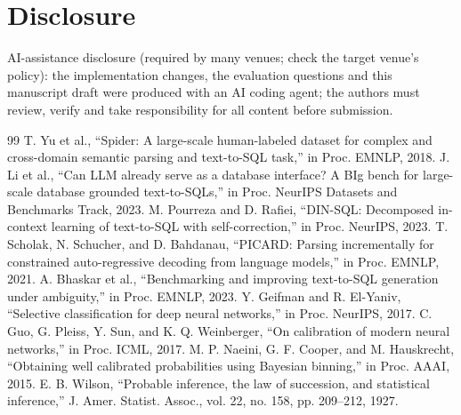 \documentclass[conference]{IEEEtran}
\begin{document}
\section*{Disclosure}AI-assistance disclosure (required by many venues; check the target venue's policy): the implementation changes, the evaluation questions and this manuscript draft were produced with an AI coding agent; the authors must review, verify and take responsibility for all content before submission.
\begin{thebibliography}{99} T. Yu et al., ``Spider: A large-scale human-labeled dataset for complex and cross-domain semantic parsing and text-to-SQL task,'' in Proc. EMNLP, 2018.
 J. Li et al., ``Can LLM already serve as a database interface? A BIg bench for large-scale database grounded text-to-SQLs,'' in Proc. NeurIPS Datasets and Benchmarks Track, 2023.
 M. Pourreza and D. Rafiei, ``DIN-SQL: Decomposed in-context learning of text-to-SQL with self-correction,'' in Proc. NeurIPS, 2023.
 T. Scholak, N. Schucher, and D. Bahdanau, ``PICARD: Parsing incrementally for constrained auto-regressive decoding from language models,'' in Proc. EMNLP, 2021.
 A. Bhaskar et al., ``Benchmarking and improving text-to-SQL generation under ambiguity,'' in Proc. EMNLP, 2023.
 Y. Geifman and R. El-Yaniv, ``Selective classification for deep neural networks,'' in Proc. NeurIPS, 2017.
 C. Guo, G. Pleiss, Y. Sun, and K. Q. Weinberger, ``On calibration of modern neural networks,'' in Proc. ICML, 2017.
 M. P. Naeini, G. F. Cooper, and M. Hauskrecht, ``Obtaining well calibrated probabilities using Bayesian binning,'' in Proc. AAAI, 2015.
 E. B. Wilson, ``Probable inference, the law of succession, and statistical inference,'' J. Amer. Statist. Assoc., vol. 22, no. 158, pp. 209--212, 1927.
\end{thebibliography}
\end{document}
